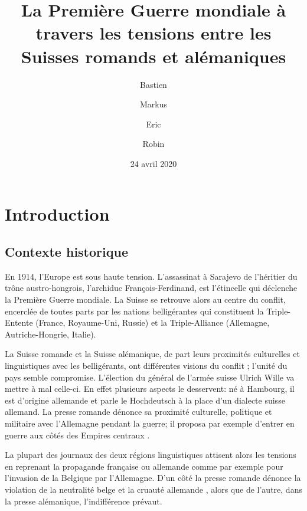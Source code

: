 \documentclass[french,a4paper]{article}
\title{La Première Guerre mondiale à travers les tensions entre les Suisses romands et alémaniques}
\author{\bsc{Beuchat} Bastien \and \bsc{Ding} Markus \and \bsc{Jollès} Eric \and \bsc{Mamie} Robin}
\date{24 avril 2020} %
\begin{document}
\maketitle


\section*{Introduction}

\subsection*{Contexte historique}

En 1914, l’Europe est sous haute tension.
L’assassinat à Sarajevo de l'héritier du trône austro-hongrois, l'archiduc François-Ferdinand, est l’étincelle qui déclenche la Première Guerre mondiale. 
La Suisse se retrouve alors au centre du conflit, encerclée de toutes parts par les nations belligérantes qui constituent la Triple-Entente (France, Royaume-Uni, Russie) et la Triple-Alliance (Allemagne, Autriche-Hongrie, Italie).

La Suisse romande et la Suisse alémanique, de part leurs proximités culturelles et linguistiques avec les belligérants, ont différentes visions du conflit \cite{division}; l'unité du pays semble compromise.
L'élection du général de l'armée suisse Ulrich Wille \cite{wahl} va mettre à mal celle-ci. 
En effet plusieurs aspects le desservent: né à Hambourg, il est d'origine allemande et parle le Hochdeutsch à la place d'un dialecte suisse allemand.
La presse romande dénonce sa proximité culturelle, politique et militaire avec l'Allemagne pendant la guerre; il proposa par exemple d'entrer en guerre aux côtés des Empires centraux \cite{krieg}.

La plupart des journaux des deux régions linguistiques attisent alors les tensions en reprenant la propagande française ou allemande \cite{place} \cite{propagande} comme par exemple pour l'invasion de la Belgique par l'Allemagne.
D'un côté la presse romande dénonce la violation de la neutralité belge et la cruauté allemande \cite{massacre}, alors que de l'autre, dans la presse alémanique, l'indifférence prévaut.
\end{document}
